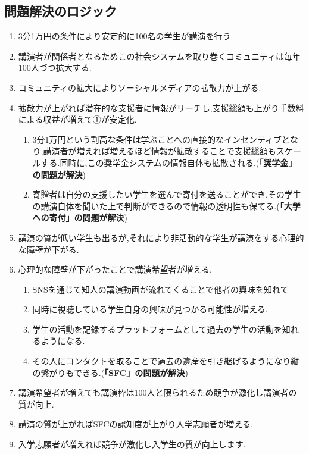 \documentclass[uplatex, a4j]{jsarticle}
\begin{document}
\subsection{問題解決のロジック}
  \begin{enumerate}
    \item 3分1万円の条件により安定的に100名の学生が講演を行う.
    \item 講演者が関係者となるためこの社会システムを取り巻くコミュニティは毎年100人づつ拡大する.
    \item コミュニティの拡大によりソーシャルメディアの拡散力が上がる.
    \item 拡散力が上がれば潜在的な支援者に情報がリーチし,支援総額も上がり手数料による収益が増えて①が安定化.
      \begin{enumerate}
        \item 3分1万円という割高な条件は学ぶことへの直接的なインセンティブとなり,講演者が増えれば増えるほど情報が拡散することで支援総額もスケールする.同時に,この奨学金システムの情報自体も拡散される.(\textbf{「奨学金」の問題が解決})
        \item 寄贈者は自分の支援したい学生を選んで寄付を送ることができ,その学生の講演自体を聞いた上で判断ができるので情報の透明性も保てる.(\textbf{「大学への寄付」の問題が解決})
      \end{enumerate}
    \item 講演の質が低い学生も出るが,それにより非活動的な学生が講演をする心理的な障壁が下がる.
    \item 心理的な障壁が下がったことで講演希望者が増える.
      \begin{enumerate}
        \item SNSを通じて知人の講演動画が流れてくることで他者の興味を知れて
        \item 同時に視聴している学生自身の興味が見つかる可能性が増える.
        \item 学生の活動を記録するプラットフォームとして過去の学生の活動を知れるようになる.
        \item その人にコンタクトを取ることで過去の遺産を引き継げるようになり縦の繋がりもできる.(\textbf{「SFC」の問題が解決})
      \end{enumerate}
    \item 講演希望者が増えても講演枠は100人と限られるため競争が激化し講演者の質が向上.
    \item 講演の質が上がればSFCの認知度が上がり入学志願者が増える.
    \item 入学志願者が増えれば競争が激化し入学生の質が向上します.
      \begin{enumerate}

\end{enumerate}
\end{enumerate}
\end{document}
